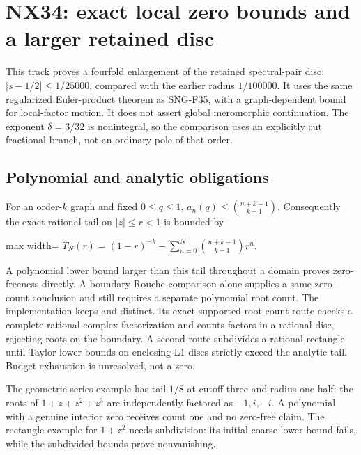 \documentclass[
  11pt,
  a4paper,
]{report}
\let\singularitytexttt\texttt
\renewcommand{\texttt}[1]{\singularitytexttt{\seqsplit{#1}}}
\begin{document}
\hypertarget{nx34-exact-local-zero-bounds-and-a-larger-retained-disc}{%
\chapter{NX34: exact local zero bounds and a larger retained
disc}\label{nx34-exact-local-zero-bounds-and-a-larger-retained-disc}}

This track proves a fourfold enlargement of the retained spectral-pair
disc: \(|s-1/2|\le1/25000\), compared with the earlier radius
\(1/100000\). It uses the same regularized Euler-product theorem as
SNG-F35, with a graph-dependent bound for local-factor motion. It does
not assert global meromorphic continuation. The exponent \(\delta=3/32\)
is nonintegral, so the comparison uses an explicitly cut fractional
branch, not an ordinary pole of that order.

\hypertarget{polynomial-and-analytic-obligations}{%
\section{Polynomial and analytic
obligations}\label{polynomial-and-analytic-obligations}}

For an order-\(k\) graph and fixed \(0\le q\le1\),
\(a_n(q)\le\binom{n+k-1}{k-1}\). Consequently the exact rational tail on
\(|z|\le r<1\) is bounded by

\begin{center}
\begin{adjustbox}{max width=\linewidth}
$\displaystyle
T_N(r)=(1-r)^{-k}-\sum_{n=0}^N\binom{n+k-1}{k-1}r^n.
$
\end{adjustbox}
\end{center}

A polynomial lower bound larger than this tail throughout a domain
proves zero-freeness directly. A boundary Rouche comparison alone
supplies a same-zero- count conclusion and still requires a separate
polynomial root count. The implementation keeps \texttt{zero\_count} and
\texttt{zero\_free} distinct. Its exact supported root-count route
checks a complete rational-complex factorization and counts factors in a
rational disc, rejecting roots on the boundary. A second route
subdivides a rational rectangle until Taylor lower bounds on enclosing
L1 discs strictly exceed the analytic tail. Budget exhaustion is
unresolved, not a zero.

The geometric-series example has tail \(1/8\) at cutoff three and radius
one half; the roots of \(1+z+z^2+z^3\) are independently factored as
\(-1,i,-i\). A polynomial with a genuine interior zero receives count
one and no zero-free claim. The rectangle example for \(1+z^2\) needs
subdivision: its initial coarse lower bound fails, while the subdivided
bounds prove nonvanishing.
\end{document}
